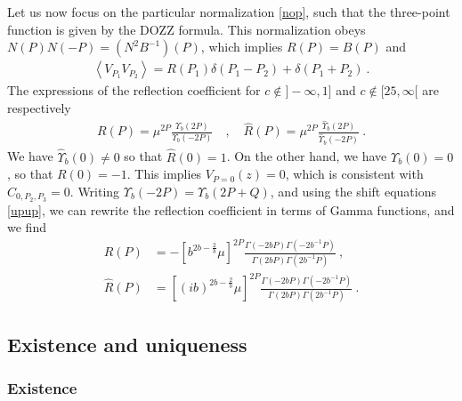 \documentclass[12pt, a4paper, notitlepage, twoside]{report}
\numberwithin{equation}{section}
\theoremstyle{break}
\begin{document}
Let us now focus on the particular normalization \eqref{nop}, such that the three-point function is given by the DOZZ formula. This normalization obeys $N(P)N(-P) = \left(N^2B^{-1}\right)(P)$, which implies $R(P)=B(P)$ and 
\begin{align}
 \left<V_{P_1}V_{P_2}\right> = R(P_1)\delta(P_1-P_2) + \delta(P_1+P_2)\ .
 \label{vvrdd}
\end{align}
The expressions of the reflection coefficient for $c\notin ]-\infty, 1]$ and $c\notin [25,\infty[$ are respectively
\begin{align}
 R(P) = \mu^{2P}\frac{\Upsilon_b(2P)}{\Upsilon_b(-2P)} \quad , \quad \hat R(P) = \mu^{2P}\frac{\hat{\Upsilon}_b(2P)}{\hat{\Upsilon}_b(-2P)}\ .
 \end{align}
We have  $\hat\Upsilon_b(0)\neq 0$ so that $\hat R(0)=1$. On the other hand, we have $\Upsilon_b(0)=0$, so that $R(0)=-1$. This implies $V_{P=0}(z)=0$, which is consistent with $C_{0,P_2,P_3}=0$.
Writing $\Upsilon_b(-2P)=\Upsilon_b(2P+Q)$, and using the shift equations \eqref{upup}, we can rewrite the reflection coefficient in terms of Gamma functions, and we find 
\begin{align}
 R(P) &= -\left[b^{2b-\frac{2}{b}}\mu\right]^{2P} \frac{\Gamma(-2bP)\Gamma(-2b^{-1}P)}{\Gamma(2bP)\Gamma(2b^{-1}P)} \ ,
 \label{ram}
\\
 \hat R(P) &= \left[(ib)^{2b-\frac{2}{b}}\mu\right]^{2P} \frac{\Gamma(-2bP)\Gamma(-2b^{-1}P)}{\Gamma(2bP)\Gamma(2b^{-1}P)} \ .
\end{align}


\subsection{Existence and uniqueness}\label{seceul}

\subsubsection{Existence}
\end{document}
